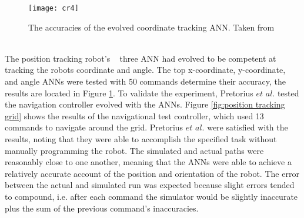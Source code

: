 \documentclass{sig-alternate}
\begin{document}
\begin{figure}%
\center
\caption{The accuracies of the evolved coordinate tracking ANN. Taken from ~\cite{Pretorius:2009:TAN:1632149.1632171}}

  \texttt{[image: cr4]}
\label{fig:ANNtable}
\end{figure}
	The  position tracking robot's ~\cite{Pretorius:2009:TAN:1632149.1632171} three ANN had evolved to be competent at tracking the robots coordinate and angle. The top x-coordinate, y-coordinate, and angle ANNs were tested with 50 commands determine their accuracy, the results are located in Figure \ref{fig:ANNtable}. To validate the experiment, Pretorius $et$ $al.$ tested the navigation controller evolved with the ANNs. Figure \ref{fig:position tracking grid} shows the results of the navigational test controller, which used 13 commands to navigate around the grid. Pretorius $et$ $al.$ were satisfied with the results, noting that they were able to accomplish the specified task without  manually programming the robot. The simulated and actual paths were reasonably close to one another, meaning that the ANNs were able to achieve a relatively accurate account of the position and orientation of the robot. The error between the actual and simulated run was expected because slight errors tended to compound, i.e. after each command the simulator would be slightly inaccurate plus the sum of the previous command's inaccuracies. 
	
\end{document}
